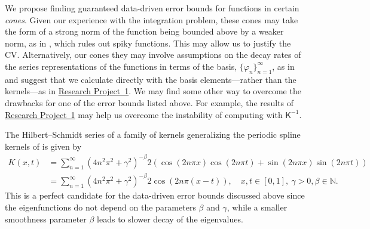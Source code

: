 \documentclass[11pt]{NSFamsart}
\newcommand{\mK}{\mathsf{K}}
\newcommand{\refproba}{\hyperref[SectHSSVD]{Research Project~1}\xspace}
\begin{document}
We propose finding guaranteed data-driven error bounds for functions in certain  \emph{cones}.  Given our experience with the integration problem, these cones may take the form of a strong norm of the function being bounded above by a weaker norm, as in \cite{HicEtal14b}, which rules out spiky functions.  This may allow us to justify the CV. Alternatively, our cones they may involve assumptions on the decay rates of the series representations of the functions in terms of the basis, $\{\varphi_n\}_{n=1}^{\infty}$, as in \cite{HicJim16a,JimHic16a} and suggest that we calculate directly with the basis elements---rather than the kernels---as in \refproba.  We may find some other way to overcome the drawbacks for one of the error bounds listed above.  For example, the results of \refproba may help us overcome the instability of computing with $\mK^{-1}$.


The Hilbert--Schmidt series of a family of kernels generalizing the periodic spline kernels of \citep[Chapt.~2]{Wah90} is given by
\begin{align}\label{PeriodicKernel}
K(x,t) &= \sum_{n=1}^\infty \left(4n^2\pi^2 + \gamma^2\right)^{-\beta} 2\left(\cos (2n\pi x) \cos (2n\pi t) + \sin (2n\pi x) \sin (2n\pi t)\right) \\
 &= \sum_{n=1}^\infty \left(4n^2\pi^2 + \gamma^2\right)^{-\beta} 2\cos\left(2n\pi(x-t)\right), \quad x,t \in [0,1],\ \gamma>0, \beta \in \mathbb{N}. \nonumber
\end{align}
This is a perfect candidate for the data-driven error bounds discussed above since the eigenfunctions do not depend on the parameters $\beta$ and $\gamma$, while a smaller smoothness parameter $\beta$ leads to slower decay of the eigenvalues.
\end{document}
